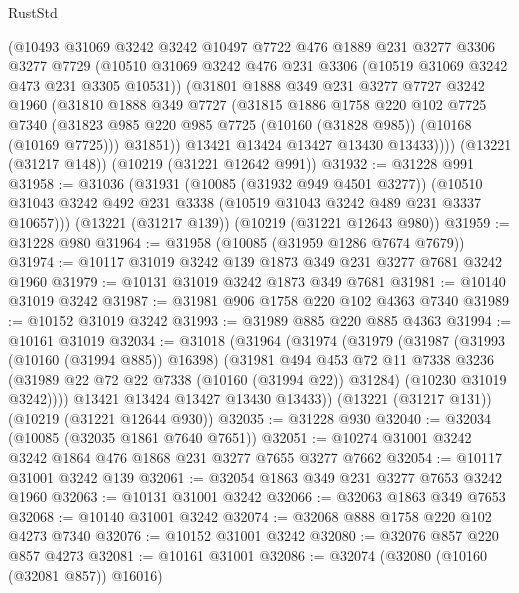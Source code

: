 \begin{lexlean}{RustStd}
\begin{coremodule}
        (@10493
          @31069
          @3242
          @3242
          @10497
          @7722
          @476
          @1889
          @231
          @3277
          @3306
          @3277
          @7729
          (@10510 @31069 @3242 @476 @231 @3306 (@10519 @31069 @3242 @473 @231 @3305 @10531))
          (@31801
            @1888
            @349
            @231
            @3277
            @7727
            @3242
            @1960
            (@31810
              @1888
              @349
              @7727
              (@31815
                @1886
                @1758
                @220
                @102
                @7725
                @7340
                (@31823 @985 @220 @985 @7725 (@10160 (@31828 @985)) (@10168 (@10169 @7725)))
                @31851))
            @13421
            @13424
            @13427
            @13430
            @13433))))
    (@13221 (@31217 @148))
    (@10219 (@31221 @12642 @991))
@31932 := @31228 @991
@31958 := @31036
    (@31931
      (@10085 (@31932 @949 @4501 @3277))
      (@10510 @31043 @3242 @492 @231 @3338 (@10519 @31043 @3242 @489 @231 @3337 @10657)))
    (@13221 (@31217 @139))
    (@10219 (@31221 @12643 @980))
@31959 := @31228 @980
@31964 := @31958 (@10085 (@31959 @1286 @7674 @7679))
@31974 := @10117 @31019 @3242 @139 @1873 @349 @231 @3277 @7681 @3242 @1960
@31979 := @10131 @31019 @3242 @1873 @349 @7681
@31981 := @10140 @31019 @3242
@31987 := @31981 @906 @1758 @220 @102 @4363 @7340
@31989 := @10152 @31019 @3242
@31993 := @31989 @885 @220 @885 @4363
@31994 := @10161 @31019
@32034 := @31018
    (@31964
      (@31974
        (@31979
          (@31987
            (@31993 (@10160 (@31994 @885)) @16398)
            (@31981
              @494
              @453
              @72
              @11
              @7338
              @3236
              (@31989 @22 @72 @22 @7338 (@10160 (@31994 @22)) @31284)
              (@10230 @31019 @3242))))
        @13421
        @13424
        @13427
        @13430
        @13433))
    (@13221 (@31217 @131))
    (@10219 (@31221 @12644 @930))
@32035 := @31228 @930
@32040 := @32034 (@10085 (@32035 @1861 @7640 @7651))
@32051 := @10274 @31001 @3242 @3242 @1864 @476 @1868 @231 @3277 @7655 @3277 @7662
@32054 := @10117 @31001 @3242 @139
@32061 := @32054 @1863 @349 @231 @3277 @7653 @3242 @1960
@32063 := @10131 @31001 @3242
@32066 := @32063 @1863 @349 @7653
@32068 := @10140 @31001 @3242
@32074 := @32068 @888 @1758 @220 @102 @4273 @7340
@32076 := @10152 @31001 @3242
@32080 := @32076 @857 @220 @857 @4273
@32081 := @10161 @31001
@32086 := @32074 (@32080 (@10160 (@32081 @857)) @16016)

\end{coremodule}
\end{lexlean}
